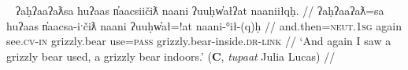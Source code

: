 \ex~ \label{ex:grizzlybearused}
\begingl
\glpreamble ʔaḥʔaaʔaƛsa huʔaas n̓aacsiičiƛ naani ʔuuḥw̓ałʔat naaniiłqḥ. //
\gla ʔaḥʔaaʔaƛ=sa huʔaas n̓aacsa-iˑčiƛ naani ʔuuḥw̓ał=!at naani-°ił-(q)ḥ //
\glb and.then=\textsc{neut.1sg} again see.\textsc{cv}-\textsc{in} grizzly.bear use=\textsc{pass} grizzly.bear-inside.\textsc{dr}-\textsc{link} //
\glft `And again I saw a grizzly bear used, a grizzly bear indoors.' (\textbf{C}, \textit{tupaat} Julia Lucas) //
\endgl
\xe

\begin{comment}

In a construction that is unique to the passive, as far as I know, it is also possible for the passive to appear on both verbs when it semantically only affects one of them. I suspect the range of verbs where this is possible is restricted, but don't know for sure. In (\ref{ex:sistervisit2}), the passive attaches to perfective `become near,' giving the meaning `approach.' The other verb `be at' is not passivized: its typical argument structure is that its subject (in this case ``sister") is the figure and object (here, ``Port Alberni") is the ground. (\ref{ex:sistervisit1}) has the exact same structure, but the passive has been ``copied" onto the second verb in the construction, without altering its subject/object relations. This is perhaps related to the status of the passive in Nuuchahnulth having ``inverse-like" properties, as has been noted by previous scholars \citep{emanatian1988, braithwaite2003}.

\ex \label{ex:sistervisit2}
\begingl
\glpreamble ƛawiičʔats łuučm̓uupukqs hił c̓uumaʕaas. //
\gla ƛaw-°iˑčƛ=!at=s łuučm̓uup=uk=qas hił c̓uumaʕaas //
\glb near-\textsc{in}=\textsc{pass}=\textsc{strg.1sg} sister=\textsc{poss}=\textsc{defn.1sg} be.at port.alberni //
\glft `My sister came to visit at Port Alberni.' (\textbf{Q}, Sophie Billy) //
\endgl
\xe

\ex~ \label{ex:sistervisit1}
\begingl
\glpreamble ƛawiičʔats łuučm̓uupukqs hiłʔat c̓uumaʕaas. //
\gla ƛaw-°iˑčƛ=!at=s łuučm̓uup=uk=qas hił=!at c̓uumaʕaas //
\glb near-\textsc{in}=\textsc{pass}=\textsc{strg.1sg} sister=\textsc{poss}=\textsc{defn.1sg} be.at=\textsc{pass} port.alberni //
\glft `My sister came to visit at Port Alberni.' (\textbf{Q}, Sophie Billy) //
\endgl
\xe
\end{comment}

